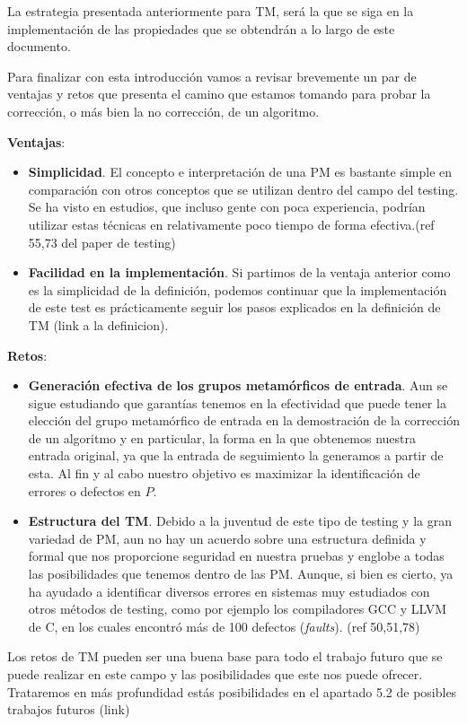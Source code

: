 La estrategia presentada anteriormente para TM, será la que se siga en la implementación de las propiedades que se obtendrán a lo largo de este documento. \newline

Para finalizar con esta introducción vamos a revisar brevemente un par de ventajas y retos que presenta el camino que estamos tomando para probar la corrección, o más bien la no corrección, de un algoritmo. \newline

\textbf{Ventajas}:
\begin{itemize}
    \item \textbf{Simplicidad}. El concepto e interpretación de una PM es bastante simple en comparación con otros conceptos que se utilizan dentro del campo del testing. Se ha visto en estudios, que incluso gente con poca experiencia, podrían utilizar estas técnicas en relativamente poco tiempo de forma efectiva.(ref 55,73 del paper de testing)
    \item \textbf{Facilidad en la implementación}. Si partimos de la ventaja anterior como es la simplicidad de la definición, podemos continuar que la implementación de este test es prácticamente seguir los pasos explicados en la definición de TM (link a la definicion).
\end{itemize}

\vspace{10pt}

\textbf{Retos}:
\begin{itemize}
    \item \textbf{Generación efectiva de los grupos metamórficos de entrada}. Aun se sigue estudiando que garantías tenemos en la efectividad que puede tener la elección del grupo metamórfico de entrada en la demostración de la corrección de un algoritmo y en particular, la forma en la que obtenemos nuestra entrada original, ya que la entrada de seguimiento la generamos a partir de esta. Al fin y al cabo nuestro objetivo es maximizar la identificación de errores o defectos en $P$.
    \item \textbf{Estructura del TM}. Debido a la juventud de este tipo de testing y la gran variedad de PM, aun no hay un acuerdo sobre una estructura definida y formal que nos proporcione seguridad en nuestra pruebas y englobe a todas las posibilidades que tenemos dentro de las PM. Aunque, si bien es cierto, ya ha ayudado a identificar diversos errores en sistemas muy estudiados con otros métodos de testing, como por ejemplo los compiladores GCC y LLVM de C, en los cuales encontró más de 100 defectos (\textit{faults}). (ref 50,51,78)
\end{itemize}

Los retos de TM pueden ser una buena base para todo el trabajo futuro que se puede realizar en este campo y las posibilidades que este nos puede ofrecer. Trataremos en más profundidad estás posibilidades en el apartado 5.2 de posibles trabajos futuros (link)



